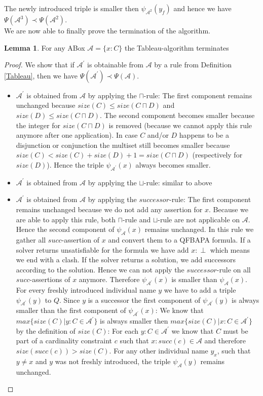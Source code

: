 \documentclass{book}
\theoremstyle{break}
\theoremstyle{definition}
\newtheorem{mylem}{Lemma}
\begin{document}
The newly introduced triple is smaller then $\psi_{\mathcal{A}^2}(y_f)$ and hence we have $\Psi(\mathcal{A}^3)\prec \Psi(\mathcal{A}^2)$.\\
We are now able to finally prove the termination of the algorithm.
\begin{mylem}
For any ABox $\mathcal{A}=\{x:C\}$ the Tableau-algorithm terminates
\end{mylem}
\begin{proof}
We show that if $\mathcal{A}^\prime$ is obtainable from $\mathcal{A}$ by a rule from Definition \ref{Tableau}, then we have $\Psi(\mathcal{A}^\prime)\prec \Psi(\mathcal{A})$.\\
\begin{itemize}
\item $\mathcal{A}^\prime$ is obtained from $\mathcal{A}$ by applying the $\sqcap$-rule: The first component remains unchanged because $size(C)\leq size(C\sqcap D)$ and $size(D)\leq size(C\sqcap D)$. The second component becomes smaller because the integer for $size(C\sqcap D)$ is removed (because we cannot apply this rule anymore after one application). In case $C$ and/or $D$ happens to be a disjunction or conjunction the multiset still becomes smaller because $size(C)< size(C)+size(D)+1=size(C\sqcap D)$ (respectively for $size(D)$). Hence the triple $\psi_{\mathcal{A}^\prime}(x)$ always becomes smaller.
\item $\mathcal{A}^\prime$ is obtained from $\mathcal{A}$ by applying the $\sqcup$-rule: similar to above
\item $\mathcal{A}^\prime$ is obtained from $\mathcal{A}$ by applying the $successor$-rule: The first component remains unchanged because we do not add any assertion for $x$. Because we are able to apply this rule, both $\sqcap$-rule and $\sqcup$-rule are not applicable on $\mathcal{A}$. Hence the second component of $\psi_\mathcal{A}(x)$ remains unchanged. In this rule we gather all $succ$-assertion of $x$ and convert them to a QFBAPA formula. If a solver returns unsatisfiable for the formula we have add $x:\perp$ which means we end with a clash. If the solver returns a solution, we add successors according to the solution. Hence we can not apply the $successor$-rule on all $succ$-assertions of $x$ anymore. Therefore $\psi_{\mathcal{A}^\prime}(x)$ is smaller than $\psi_\mathcal{A}(x)$.\\
For every freshly introduced individual name $y$ we have to add a triple $\psi_{\mathcal{A}^\prime}(y)$ to $Q$. Since $y$ is a successor the first component of $\psi_{\mathcal{A}^\prime}(y)$ is always smaller than the first component of $\psi_{\mathcal{A}^\prime}(x)$: We know that $max\{size(C)|y:C\in\mathcal{A}^\prime\}$ is always smaller then $max\{size(C)|x:C\in\mathcal{A}^\prime\}$ by the definition of $size(C)$: For each $y:C\in\mathcal{A}^\prime$ we know that $C$ must be part of a cardinality constraint $c$ such that $x:succ(c)\in\mathcal{A}$ and therefore $size(succ(c))>size(C)$. For any other individual name $y_x$, such that $y\neq x$ and $y$ was not freshly introduced, the triple $\psi_\mathcal{A}(y)$ remains unchanged.

\end{itemize}
\end{proof}
\end{document}
